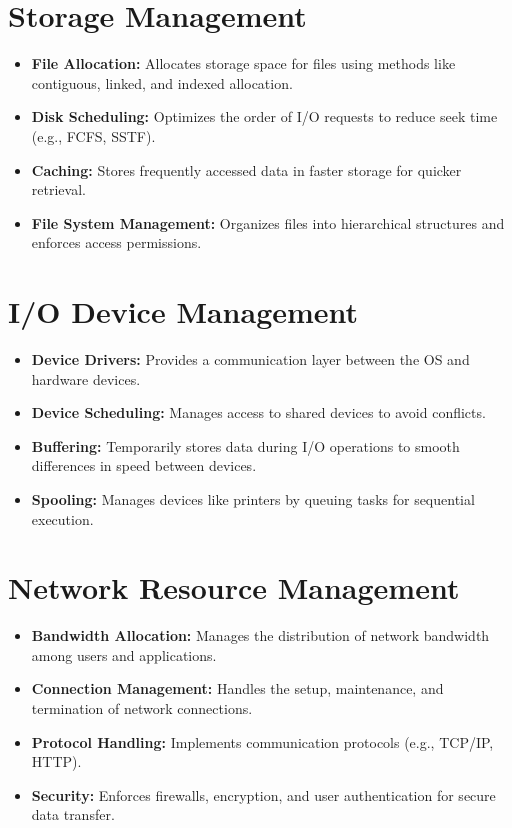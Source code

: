 \documentclass[openany]{book} %
\begin{document}
\section{Storage Management}
\begin{itemize}
    \item \textbf{File Allocation:} Allocates storage space for files using methods like contiguous, linked, and indexed allocation.
    \item \textbf{Disk Scheduling:} Optimizes the order of I/O requests to reduce seek time (e.g., FCFS, SSTF).
    \item \textbf{Caching:} Stores frequently accessed data in faster storage for quicker retrieval.
    \item \textbf{File System Management:} Organizes files into hierarchical structures and enforces access permissions.
\end{itemize}

\section{I/O Device Management}
\begin{itemize}
    \item \textbf{Device Drivers:} Provides a communication layer between the OS and hardware devices.
    \item \textbf{Device Scheduling:} Manages access to shared devices to avoid conflicts.
    \item \textbf{Buffering:} Temporarily stores data during I/O operations to smooth differences in speed between devices.
    \item \textbf{Spooling:} Manages devices like printers by queuing tasks for sequential execution.
\end{itemize}

\section{Network Resource Management}
\begin{itemize}
    \item \textbf{Bandwidth Allocation:} Manages the distribution of network bandwidth among users and applications.
    \item \textbf{Connection Management:} Handles the setup, maintenance, and termination of network connections.
    \item \textbf{Protocol Handling:} Implements communication protocols (e.g., TCP/IP, HTTP).
    \item \textbf{Security:} Enforces firewalls, encryption, and user authentication for secure data transfer.
\end{itemize}
\end{document}
